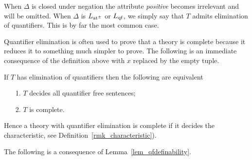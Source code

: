 
When $\Delta$ is closed under negation the attribute \textit{positive\/} becomes irrelevant and will be omitted. When $\Delta$ is $L_{\rm at^{\scriptscriptstyle\pm}}$ or $L_{\rm qf}$, we simply say that $T$ admits elimination of quantifiers. This is by far the most common case.

Quantifier elimination is often used to prove that a theory is complete because it reduces it to something much simpler to prove. The following is an immediate consequence of the definition above with $x$ replaced by the empty tuple.

\begin{remark}
If $T$ has elimination of quantifiers then the following are equivalent 
\begin{itemize}
\item[1.] $T$ decides all quantifier free sentences;
\item[2.] $T$ is complete.
\end{itemize}
Hence a theory with quantifier elimination is complete if it decides the characteristic, see Definition~\ref{rmk_characteristic}).\QED
\end{remark}


The following is a consequence of Lemma~\ref{lem_qfdefinability}.

